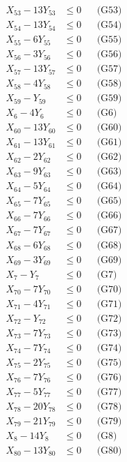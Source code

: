\documentclass[a4paper,10pt]{article}
\begin{document}
{\begin{align}
X_{53} - 13Y_{53} &\leq 0 && \text{(G53)} \\
X_{54} - 13Y_{54} &\leq 0 && \text{(G54)} \\
\allowbreak
X_{55} - 6Y_{55} &\leq 0 && \text{(G55)} \\
X_{56} - 3Y_{56} &\leq 0 && \text{(G56)} \\
X_{57} - 13Y_{57} &\leq 0 && \text{(G57)} \\
X_{58} - 4Y_{58} &\leq 0 && \text{(G58)} \\
X_{59} - Y_{59} &\leq 0 && \text{(G59)} \\
X_{6} - 4Y_{6} &\leq 0 && \text{(G6)} \\
X_{60} - 13Y_{60} &\leq 0 && \text{(G60)} \\
X_{61} - 13Y_{61} &\leq 0 && \text{(G61)} \\
X_{62} - 2Y_{62} &\leq 0 && \text{(G62)} \\
X_{63} - 9Y_{63} &\leq 0 && \text{(G63)} \\
X_{64} - 5Y_{64} &\leq 0 && \text{(G64)} \\
X_{65} - 7Y_{65} &\leq 0 && \text{(G65)} \\
X_{66} - 7Y_{66} &\leq 0 && \text{(G66)} \\
X_{67} - 7Y_{67} &\leq 0 && \text{(G67)} \\
X_{68} - 6Y_{68} &\leq 0 && \text{(G68)} \\
X_{69} - 3Y_{69} &\leq 0 && \text{(G69)} \\
X_{7} - Y_{7} &\leq 0 && \text{(G7)} \\
X_{70} - 7Y_{70} &\leq 0 && \text{(G70)} \\
X_{71} - 4Y_{71} &\leq 0 && \text{(G71)} \\
X_{72} - Y_{72} &\leq 0 && \text{(G72)} \\
\allowbreak
X_{73} - 7Y_{73} &\leq 0 && \text{(G73)} \\
X_{74} - 7Y_{74} &\leq 0 && \text{(G74)} \\
X_{75} - 2Y_{75} &\leq 0 && \text{(G75)} \\
X_{76} - 7Y_{76} &\leq 0 && \text{(G76)} \\
X_{77} - 5Y_{77} &\leq 0 && \text{(G77)} \\
X_{78} - 20Y_{78} &\leq 0 && \text{(G78)} \\
X_{79} - 21Y_{79} &\leq 0 && \text{(G79)} \\
X_{8} - 14Y_{8} &\leq 0 && \text{(G8)} \\
X_{80} - 13Y_{80} &\leq 0 && \text{(G80)} \\

\end{align}}
\end{document}

